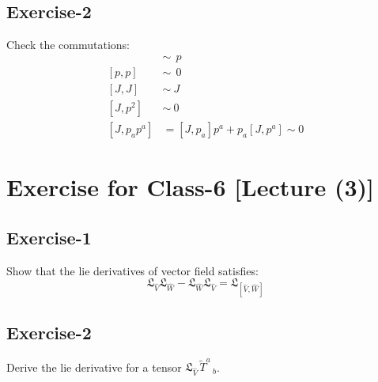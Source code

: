 \documentclass[14pt]{article} %
\begin{document}
\subsection{Exercise-2}
Check the commutations:
\begin{align*}
    [J, p]~~ &\sim ~~p \\
    [p, p]~~ &\sim ~~0 \\
    [J, J]~~ &\sim ~J \\
    [J, p^2]~ &\sim ~0 \\
    [J, p_ap^a] &= [J, p_a]p^a + p_a[J, p^a]\sim 0
\end{align*}



\section{Exercise for Class-6 [Lecture (3)]}
\subsection{Exercise-1}
Show that the lie derivatives of vector field satisfies:
\[
\mathfrak{L}_{\hat{V}} \mathfrak{L}_{\hat{W}} - \mathfrak{L}_{\hat{W}} \mathfrak{L}_{\hat{V}} = \mathfrak{L}_{[\hat{V},\hat{W}]}
\]
\subsection{Exercise-2}
Derive the lie derivative for a tensor $\mathfrak{L}_{\hat{V}}\, \tilde{T}^a\,_b $.
\end{document}
